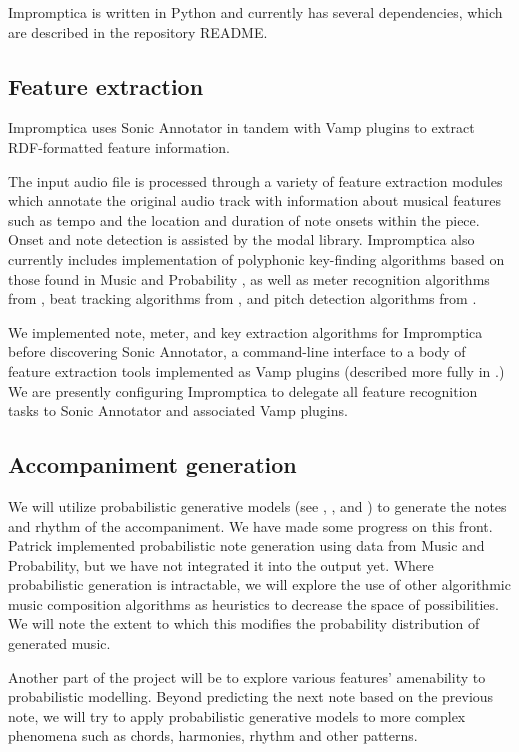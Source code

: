 \documentclass[11pt,conference,letterpaper]{IEEEtran}
\begin{document}
Impromptica is written in Python and currently has several dependencies, which are described in the repository README.

\subsection{Feature extraction}

Impromptica uses Sonic Annotator in tandem with Vamp plugins to extract RDF-formatted feature information.

The input audio file is processed through a variety of feature extraction modules which annotate the original audio track with information about musical features such as tempo and the location and duration of note onsets within the piece. Onset and note detection is assisted by the modal library. Impromptica also currently includes implementation of polyphonic key-finding algorithms based on those found in Music and Probability \cite{temperly2007mprob}, as well as meter recognition algorithms from \cite{klapuri2006analysis}, beat tracking algorithms from \cite{ellis2007beat}, and pitch detection algorithms from \cite{TODO}.

We implemented note, meter, and key extraction algorithms for Impromptica before discovering Sonic Annotator, a command-line interface to a body of feature extraction tools implemented as Vamp plugins (described more fully in \cite{cannam2010sonic}.) We are presently configuring Impromptica to delegate all feature recognition tasks to Sonic Annotator and associated Vamp plugins.

\subsection{Accompaniment generation}

We will utilize probabilistic generative models (see \cite{temperly2007mprob}, \cite{conklin2003music}, and \cite{mccormack1996grammar}) to generate the notes and rhythm of the accompaniment. We have made some progress on this front. Patrick implemented probabilistic note generation using data from Music and Probability, but we have not integrated it into the output yet. Where probabilistic generation is intractable, we will explore the use of other algorithmic music composition algorithms as heuristics to decrease the space of possibilities. We will note the extent to which this modifies the probability distribution of generated music.

Another part of the project will be to explore various features’ amenability to probabilistic modelling. Beyond predicting the next note based on the previous note, we will try to apply probabilistic generative models to more complex phenomena such as chords, harmonies, rhythm and other patterns.
\end{document}
